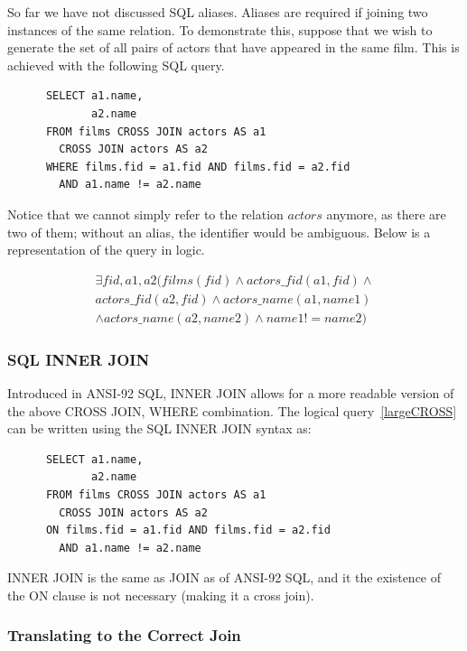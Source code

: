 \documentclass[a4paper, 11pt]{article}
\begin{document}
      So far we have not discussed SQL aliases. Aliases are required if joining
      two instances of the same relation. To demonstrate this, suppose that we
      wish to generate the set of all pairs of actors that have appeared in the
      same film. This is achieved with the following SQL query.

      \begin{verbatim}
      SELECT a1.name,
             a2.name
      FROM films CROSS JOIN actors AS a1
        CROSS JOIN actors AS a2
      WHERE films.fid = a1.fid AND films.fid = a2.fid 
        AND a1.name != a2.name
      \end{verbatim}

      Notice that we cannot simply refer to the relation $actors$ anymore, as
      there are two of them; without an alias, the identifier would be
      ambiguous. Below is a representation of the query in logic.

      \begin{multline}
        \exists fid, a1, a2(films(fid) \land actors\_fid(a1, fid) \land \\
        actors\_fid(a2, fid) \land actors\_name(a1, name1)\\
        \land actors\_name(a2, name2) \land name1 != name2) \label{largeCROSS}
      \end{multline}

    \subsubsection{SQL INNER JOIN}

      Introduced in ANSI-92 SQL, INNER JOIN allows for a more readable version of
      the above CROSS JOIN, WHERE combination. The logical query~\ref{largeCROSS}
      can be written using the SQL INNER JOIN syntax as:

      \begin{verbatim}
      SELECT a1.name,
             a2.name
      FROM films CROSS JOIN actors AS a1
        CROSS JOIN actors AS a2
      ON films.fid = a1.fid AND films.fid = a2.fid 
        AND a1.name != a2.name
      \end{verbatim}

      INNER JOIN is the same as JOIN as of ANSI-92 SQL, and it the existence of
      the ON clause is not necessary (making it a cross join).

    \subsubsection{Translating to the Correct Join}
\end{document}
